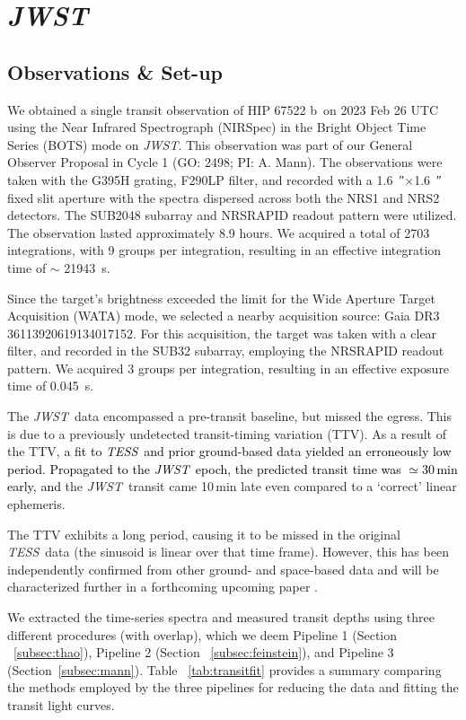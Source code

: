 \documentclass[twocolumn]{aastex63} %
\newcommand{\tess}{\textit{TESS}}
\newcommand{\jwst}{\textit{JWST}}
\newcommand{\plname}{HIP 67522 b}
\newcommand{\newedit}[1]{\textcolor{black}{#1}}
\begin{document}
\section{\jwst} \label{sec:jwst}

\subsection{Observations \& Set-up}

We obtained a single transit observation of \plname\ on 2023 Feb 26 UTC using the Near Infrared Spectrograph (NIRSpec) in the Bright Object Time Series (BOTS) mode on \jwst. This observation was part of our General Observer Proposal in Cycle 1 (GO: 2498; PI: A. Mann). The observations were taken with the G395H grating, F290LP filter, and recorded with a \SI{1.6}{\arcsecond}$\times$\SI{1.6}{\arcsecond} fixed slit aperture with the spectra dispersed across both the NRS1 and NRS2 detectors. The SUB2048 subarray and NRSRAPID readout pattern were utilized. The observation lasted approximately 8.9 hours. We acquired a total of 2703 integrations, with 9 groups per integration, resulting in an effective integration time of $\sim$ 21943~s. 

Since the target's brightness exceeded the limit for the Wide Aperture Target Acquisition (WATA) mode, we selected a nearby acquisition source: Gaia DR3 36113920619134017152. For this acquisition, the target was taken with a clear filter, and recorded in the SUB32 subarray, employing the NRSRAPID readout pattern. We acquired 3 groups per integration, resulting in an effective exposure time of 0.045~s.   

The \jwst\ data encompassed a pre-transit baseline, but missed the egress. This is due to a previously undetected transit-timing variation (TTV). As a result of the TTV, \newedit{a fit to \tess\ and prior ground-based data yielded an erroneously low period. Propagated to the \jwst\ epoch, the predicted transit time was $\simeq$30\,min early, and} the \jwst\ transit came 10\,min late even compared to a `correct' linear ephemeris. 

The TTV exhibits a long period, causing it to be missed in the original \tess\ data (the sinusoid is linear over that time frame). However, this has been independently confirmed from other ground- and space-based data and will be characterized further in a forthcoming upcoming paper \citep{Thao_inprep}. 

We extracted the time-series spectra and measured transit depths using three different procedures (with overlap), which we deem Pipeline 1 (Section ~\ref{subsec:thao}), Pipeline 2 (Section ~\ref{subsec:feinstein}), and Pipeline 3 (Section~\ref{subsec:mann}). Table ~\ref{tab:transitfit}  provides a summary comparing the methods employed by the three pipelines for reducing the data and fitting the transit light curves.
\end{document}
